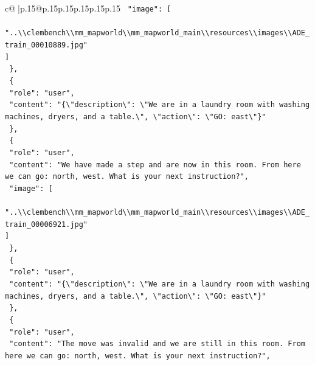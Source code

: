 \documentclass{article}
\begin{document}
{\begin{supertabular}{c@{$\;$}|p{.15\linewidth}@{}p{.15\linewidth}p{.15\linewidth}p{.15\linewidth}p{.15\linewidth}p{.15\linewidth}}
{{{\texttt{    "image": {[}} \\
\texttt{      "..\textbackslash{}\textbackslash{}clembench\textbackslash{}\textbackslash{}mm\_mapworld\textbackslash{}\textbackslash{}mm\_mapworld\_main\textbackslash{}\textbackslash{}resources\textbackslash{}\textbackslash{}images\textbackslash{}\textbackslash{}ADE\_train\_00010889.jpg"} \\
\texttt{    {]}} \\
\texttt{  \},} \\
\texttt{  \{} \\
\texttt{    "role": "user",} \\
\texttt{    "content": "\{\textbackslash{}"description\textbackslash{}": \textbackslash{}"We are in a laundry room with washing machines, dryers, and a table.\textbackslash{}", \textbackslash{}"action\textbackslash{}": \textbackslash{}"GO: east\textbackslash{}"\}"} \\
\texttt{  \},} \\
\texttt{  \{} \\
\texttt{    "role": "user",} \\
\texttt{    "content": "We have made a step and are now in this room. From here we can go: north, west. What is your next instruction?",} \\
\texttt{    "image": {[}} \\
\texttt{      "..\textbackslash{}\textbackslash{}clembench\textbackslash{}\textbackslash{}mm\_mapworld\textbackslash{}\textbackslash{}mm\_mapworld\_main\textbackslash{}\textbackslash{}resources\textbackslash{}\textbackslash{}images\textbackslash{}\textbackslash{}ADE\_train\_00006921.jpg"} \\
\texttt{    {]}} \\
\texttt{  \},} \\
\texttt{  \{} \\
\texttt{    "role": "user",} \\
\texttt{    "content": "\{\textbackslash{}"description\textbackslash{}": \textbackslash{}"We are in a laundry room with washing machines, dryers, and a table.\textbackslash{}", \textbackslash{}"action\textbackslash{}": \textbackslash{}"GO: east\textbackslash{}"\}"} \\
\texttt{  \},} \\
\texttt{  \{} \\
\texttt{    "role": "user",} \\
\texttt{    "content": "The move was invalid and we are still in this room. From here we can go: north, west. What is your next instruction?",} \\
}}}
\end{supertabular}}
\end{document}
